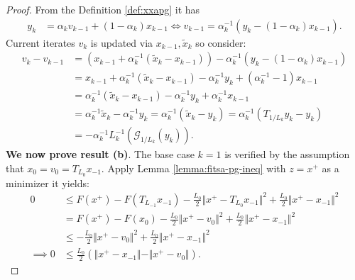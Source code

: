 \documentclass[12pt]{report}
\begin{document}
\begin{proof}
            From the Definition \ref{def:xxapg} it has 
            \begin{align*}
                y_k &= \alpha_k v_{k - 1} + (1 - \alpha_k)x_{k - 1}
                \iff 
                v_{k - 1} = \alpha_k^{-1}(y_k - (1 - \alpha_k)x_{k - 1}). 
            \end{align*}
            Current iterates $v_k$ is updated via $x_{k-1}, \tilde x_k$ so consider:
            \begin{align*}    
                v_k - v_{k - 1} &= 
                (x_{k - 1} + \alpha_k^{-1}(\tilde x_k - x_{k - 1})) - \alpha_k^{-1}(y_k - (1 - \alpha_k)x_{k - 1})
                \\
                &= 
                x_{k - 1} + \alpha_k^{-1}(\tilde x_k - x_{k - 1})
                - \alpha_k^{-1}y_k + (\alpha_k^{-1} - 1)x_{k - 1}
                \\
                &= \alpha_k^{-1}(\tilde x_k - x_{k - 1}) - \alpha_k^{-1}y_k + \alpha_k^{-1} x_{k - 1}
                \\
                &= \alpha_k^{-1}\tilde x_k - \alpha_k^{-1} y_k 
                = \alpha^{-1}_k(\tilde x_k - y_k) = \alpha_k^{-1}(T_{1/L_k} y_k - y_k)
                \\
                &= -\alpha_k^{-1}L_k^{-1}(\mathcal G_{1/L_k}(y_k)). 
            \end{align*}
            \textbf{We now prove result (b)}. 
            The base case $k = 1$ is verified by the assumption that $x_0 = v_0 = T_{L_0} x_{-1}$. 
            Apply Lemma \ref{lemma:fitsa-pg-ineq} with $z =x^+$ as a minimizer it yields: 
            \begin{align*}
                0 &\le 
                F(x^+) - F(T_{L_{-1}}x_{-1}) - \frac{L_0}{2}\Vert x^+ - T_{L_0}x_{-1}\Vert^2 + 
                \frac{L_0}{2}\Vert x^+ - x_{-1}\Vert^2
                \\
                &= 
                F(x^+) - F(x_0) - \frac{L_0}{2}\Vert x^+ - v_0\Vert^2 + 
                \frac{L_0}{2}\Vert x^+ - x_{-1}\Vert^2
                \\
                &\le 
                - \frac{L_0}{2}\Vert x^+ - v_0\Vert^2 + 
                \frac{L_0}{2}\Vert x^+ - x_{-1}\Vert^2
                \\
                \implies 
                0&\le \frac{L_0}{2}\left(
                    \Vert x^+ - x_{-1}\Vert- \Vert x^+ - v_0\Vert 
                \right). 
            \end{align*}

\end{proof}
\end{document}
